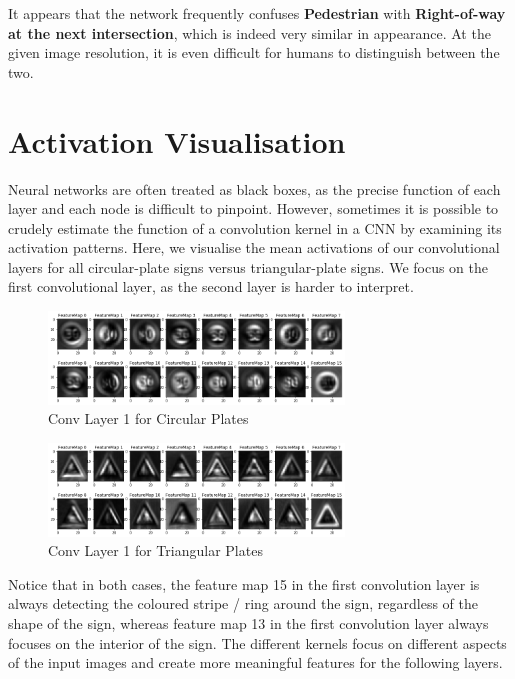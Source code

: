 \documentclass[]{article}
\begin{document}
It appears that the network frequently confuses \textbf{Pedestrian} with \textbf{Right-of-way at the next intersection}, which is indeed very similar in appearance. At the given image resolution, it is even difficult for humans to distinguish between the two.

\section{Activation Visualisation}

Neural networks are often treated as black boxes, as the precise function of each layer and each node is difficult to pinpoint. However, sometimes it is possible to crudely estimate the function of a convolution kernel in a CNN by examining its activation patterns. Here, we visualise the mean activations of our convolutional layers for all circular-plate signs versus triangular-plate signs. We focus on the first convolutional layer, as the second layer is harder to interpret.

\begin{figure}[H]
	\centering
	\includegraphics[width=0.7\textwidth]{fm1c}
	\caption{Conv Layer 1 for Circular Plates}
	\label{fig:c1}
\end{figure}

\begin{figure}[H]
	\centering
	\includegraphics[width=0.7\textwidth]{fm1t}
	\caption{Conv Layer 1 for Triangular Plates}
	\label{fig:t1}
\end{figure}

Notice that in both cases, the feature map 15 in the first convolution layer is always detecting the coloured stripe / ring around the sign, regardless of the shape of the sign, whereas feature map 13 in the first convolution layer always focuses on the interior of the sign. The different kernels focus on different aspects of the input images and create more meaningful features for the following layers.
\end{document}
